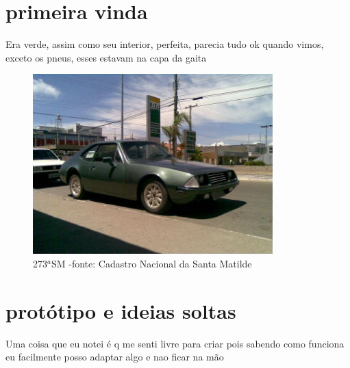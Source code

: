 \documentclass[a4paper]{report}
\begin{document}
\section*{primeira vinda}

Era verde, assim como seu interior, perfeita, parecia tudo ok quando vimos, exceto os pneus, esses estavam na capa da gaita

\begin{figure}[!htb]
\centering
\includegraphics{sm273}
\caption{273$^{a}$SM -fonte: Cadastro Nacional da Santa Matilde}
\label{sm_273}
\end{figure}

\section*{prot\'otipo e ideias soltas}
Uma coisa que eu notei \'e q me senti livre para criar pois sabendo como funciona eu facilmente posso adaptar algo e nao ficar na m\~ao
\clearpage
\printindex
\end{document}
